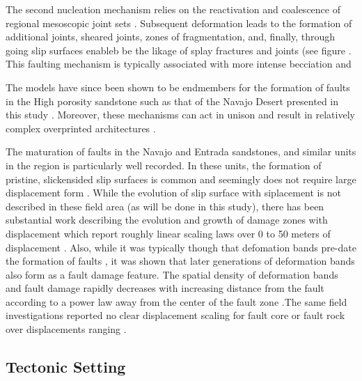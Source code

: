 \documentclass[12pt,a4paper]{article}
\begin{document}
The second nucleation mechanism relies on the reactivation and coalescence of regional mesoscopic joint sets \cite{myers1999structure, davatzes2003overprinting}. Subsequent deformation leads to the formation of additional joints, sheared joints, zones of fragmentation, and, finally, through going slip surfaces enableb be the likage of splay fractures and joints (see figure \cite{fault_nucleation_b}. This faulting mechanism is typically associated with more intense becciation and 

The models have since been shown to be endmembers for the formation of faults in the High porosity sandstone such as that of the Navajo Desert presented in this study . Moreover, these mechanisms can act in unison and result in relatively complex overprinted architectures \cite{davatzes2003overprinting}.

The maturation of faults in the Navajo and Entrada sandstones, and similar units in the region is particularly well recorded. In these units, the formation of pristine, slickensided slip surfaces is common and seemingly does not require large displacement form \cite{aydin1977faulting, aydin1978development}. While the evolution of slip surface with siplacement is not  described in these field area (as will be done in this study), there has been substantial work describing the evolution and growth of damage zones with displacement which report roughly linear scaling laws over 0 to 50 meters of displacement \cite{shipton2001damage, shipton2003conceptual, davatzes2005distribution}. Also, while it was typically though that defomation bands pre-date the formation of faults \cite{aydin1977faulting, aydin1978development}, it was shown that later generations of deformation bands also form as a fault damage feature. The spatial density of deformation bands and fault damage rapidly decreases with increasing distance from the fault according to a power law away from the center of the fault zone  \cite{shipton2001damage, shipton2003conceptual}.The same field investigations reported no clear displacement scaling for fault core or fault rock over displacements ranging \cite{shipton2001damage, shipton2006thick}.

\subsection{Tectonic Setting}
\end{document}
